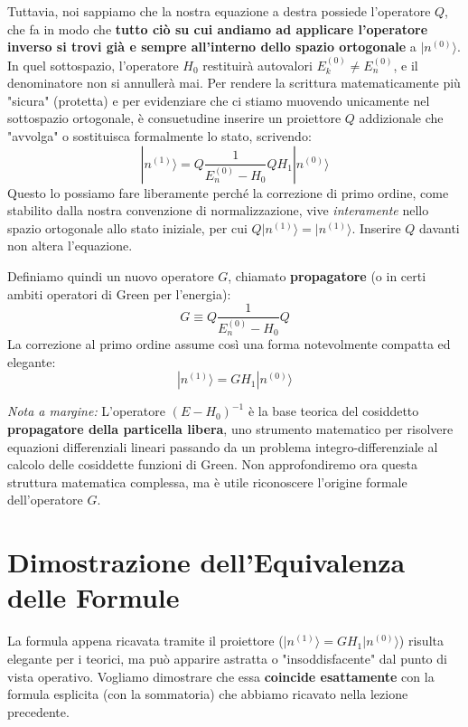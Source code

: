 Tuttavia, noi sappiamo che la nostra equazione a destra possiede l'operatore $Q$, che fa in modo che \textbf{tutto ciò su cui andiamo ad applicare l'operatore inverso si trovi già e sempre all'interno dello spazio ortogonale} a $\vert{}n^{(0)}\rangle$. In quel sottospazio, l'operatore $H_0$ restituirà autovalori $E_k^{(0)} \neq E_n^{(0)}$, e il denominatore non si annullerà mai.
Per rendere la scrittura matematicamente più "sicura" (protetta) e per evidenziare che ci stiamo muovendo unicamente nel sottospazio ortogonale, è consuetudine inserire un proiettore $Q$ addizionale che "avvolga" o sostituisca formalmente lo stato, scrivendo:
\begin{equation}
|n^{(1)}\rangle = Q \frac{1}{E_n^{(0)} - H_0} Q H_1 |n^{(0)}\rangle
\end{equation}
Questo lo possiamo fare liberamente perché la correzione di primo ordine, come stabilito dalla nostra convenzione di normalizzazione, vive \textit{interamente} nello spazio ortogonale allo stato iniziale, per cui $Q\vert{}n^{(1)}\rangle = \vert{}n^{(1)}\rangle$. Inserire $Q$ davanti non altera l'equazione.

Definiamo quindi un nuovo operatore $G$, chiamato \textbf{propagatore} (o in certi ambiti operatori di Green per l'energia):
\begin{equation}
G \equiv Q \frac{1}{E_n^{(0)} - H_0} Q
\end{equation}
La correzione al primo ordine assume così una forma notevolmente compatta ed elegante:
\begin{equation}
|n^{(1)}\rangle = G H_1 |n^{(0)}\rangle
\end{equation}

\textit{Nota a margine:} L'operatore $(E - H_0)^{-1}$ è la base teorica del cosiddetto \textbf{propagatore della particella libera}, uno strumento matematico per risolvere equazioni differenziali lineari passando da un problema integro-differenziale al calcolo delle cosiddette funzioni di Green. Non approfondiremo ora questa struttura matematica complessa, ma è utile riconoscere l'origine formale dell'operatore $G$.

\section{Dimostrazione dell'Equivalenza delle Formule}

La formula appena ricavata tramite il proiettore ($\vert{}n^{(1)}\rangle = G H_1 \vert{}n^{(0)}\rangle$) risulta elegante per i teorici, ma può apparire astratta o "insoddisfacente" dal punto di vista operativo. Vogliamo dimostrare che essa \textbf{coincide esattamente} con la formula esplicita (con la sommatoria) che abbiamo ricavato nella lezione precedente.

